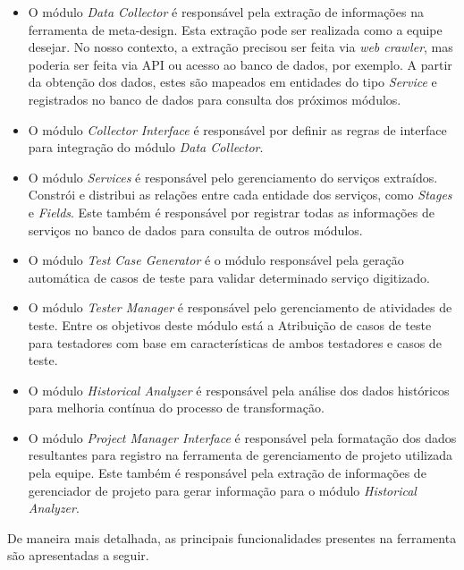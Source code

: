 \begin{itemize}
    \item O módulo \textit{Data Collector} é responsável pela extração de informações na ferramenta de meta-design. Esta extração pode ser realizada como a equipe desejar. No nosso contexto, a extração precisou ser feita via \textit{web crawler}, mas poderia ser feita via API ou acesso ao banco de dados, por exemplo. A partir da obtenção dos dados, estes são mapeados em entidades do tipo \textit{Service} e registrados no banco de dados para consulta dos próximos módulos. 
    
    \item O módulo \textit{Collector Interface} é responsável por definir as regras de interface para integração do módulo \textit{Data Collector}.
    
    \item O módulo \textit{Services} é responsável pelo gerenciamento do serviços extraídos. Constrói e distribui as relações entre cada entidade dos serviços, como \textit{Stages} e \textit{Fields}. Este também é responsável por registrar todas as informações de serviços no banco de dados para consulta de outros módulos.
    
    \item O módulo \textit{Test Case Generator} é o módulo responsável pela geração automática de casos de teste para validar determinado serviço digitizado.
    
    \item O módulo \textit{Tester Manager} é responsável pelo gerenciamento de atividades de teste. Entre os objetivos deste módulo está a Atribuição de casos de teste para testadores com base em características de ambos testadores e casos de teste.
    
    \item O módulo \textit{Historical Analyzer} é responsável pela análise dos dados históricos para melhoria contínua do processo de transformação. 
    
    \item O módulo \textit{Project Manager Interface} é responsável pela formatação dos dados resultantes para registro na ferramenta de gerenciamento de projeto utilizada pela equipe. Este também é responsável pela extração de informações de gerenciador de projeto para gerar informação para o módulo \textit{Historical Analyzer}.
\end{itemize}

De maneira mais detalhada, as principais funcionalidades presentes na ferramenta são apresentadas a seguir.

